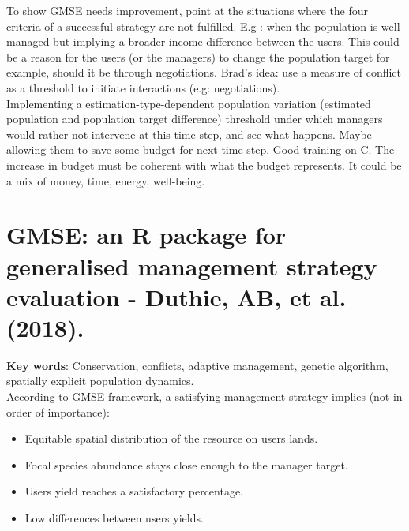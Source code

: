 \documentclass[12pt]{article}
\begin{document}
To show GMSE needs improvement, point at the situations where the four criteria of a successful strategy are not fulfilled. E.g : when the population is well managed but implying a broader income difference between the users. This could be a reason for the users (or the managers) to change the population target for example, should it be through negotiations.
Brad's idea: use a measure of conflict as a threshold to initiate interactions (e.g: negotiations).\\
Implementing a estimation-type-dependent population variation (estimated population and population target difference) threshold under which managers would rather not intervene at this time step, and see what happens.
Maybe allowing them to save some budget for next time step.
Good training on C. The increase in budget must be coherent with what the budget represents.
It could be a mix of money, time, energy, well-being.\\


\section{GMSE:  an  R  package  for generalised  management  strategy  evaluation - Duthie,  AB,  et al.  (2018).}

\textbf{Key words}: Conservation, conflicts, adaptive management, genetic algorithm, spatially explicit population dynamics.\\

According to GMSE framework, a satisfying management strategy implies (not in order of importance):
\begin{itemize}
    \item Equitable spatial distribution of the resource on users lands.
    \item Focal species abundance stays close enough to the manager target.
    \item Users yield reaches a satisfactory percentage.
    \item Low differences between users yields.
\end{itemize}
\end{document}
